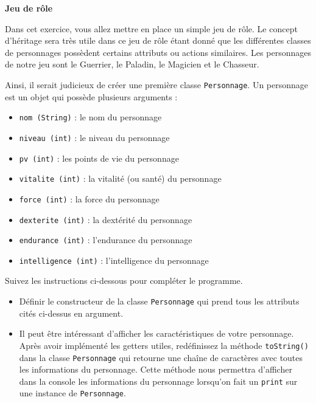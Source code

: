 \begin{Exercice}[15 minutes]\textbf{Jeu de rôle}

    
    Dans cet exercice, vous allez mettre en place un simple jeu de rôle. Le concept d’héritage sera très utile dans ce jeu de rôle étant donné que les différentes classes de personnages possèdent certains attributs ou actions similaires. Les personnages de notre jeu sont le Guerrier, le Paladin, le Magicien et le Chasseur. 
    
    Ainsi, il serait judicieux de créer une première classe \lstinline{Personnage}. Un personnage est un objet qui possède plusieurs arguments :
    \begin{itemize}
        \item \lstinline{nom (String)} : le nom du personnage
        \item \lstinline{niveau (int)} : le niveau du personnage
        \item \lstinline{pv (int)} : les points de vie du personnage
        \item \lstinline{vitalite (int)} : la vitalité (ou santé) du personnage
        \item \lstinline{force (int)} : la force du personnage
        \item \lstinline{dexterite (int)} : la dextérité du personnage
        \item \lstinline{endurance (int)} : l’endurance du personnage
        \item \lstinline{intelligence (int)} : l’intelligence du personnage\\
    \end{itemize}
    
    Suivez les instructions ci-dessous pour compléter le programme.
    
    \begin{itemize}
        \item Définir le constructeur de la classe \lstinline{Personnage} qui prend tous les attributs cités ci-dessus en argument. 
        
       \item Il peut être intéressant d’afficher les caractéristiques de votre personnage. Après avoir implémenté les getters utiles, redéfinissez la méthode \lstinline{toString()} dans la classe \lstinline{Personnage} qui retourne une chaîne de caractères avec toutes les informations du 
       personnage. Cette méthode nous permettra d'afficher dans la console les informations du personnage lorsqu'on fait un \lstinline{print} sur une instance de \lstinline{Personnage}.


\end{itemize}
\end{Exercice}
